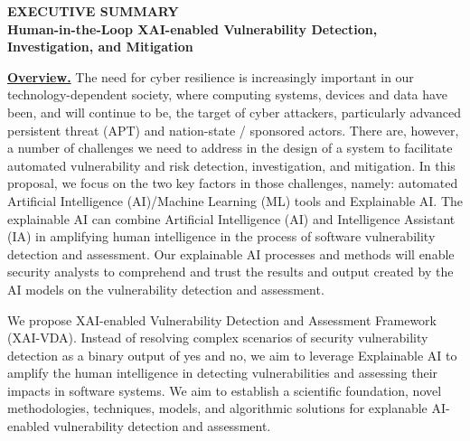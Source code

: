 \documentclass[11pt]{article}
\begin{document}

\begin{center}
  {\bf EXECUTIVE SUMMARY\\ Human-in-the-Loop XAI-enabled Vulnerability Detection, Investigation, and Mitigation}
\end{center}

\noindent \underline{\bf Overview.}  The need for cyber resilience is
increasingly important in our technology-dependent society, where
computing systems, devices and data have been, and will continue to
be, the target of cyber attackers, particularly advanced persistent
threat (APT) and nation-state / sponsored actors. There are, however,
a number of challenges we need to address in the design of a system to
facilitate automated vulnerability and risk detection, investigation,
and mitigation. In this proposal, we focus on the two key factors in
those challenges, namely: automated Artificial Intelligence
(AI)/Machine Learning (ML) tools and Explainable AI. The explainable AI
can combine Artificial Intelligence (AI) and Intelligence Assistant
(IA) in amplifying human intelligence in the process of software
vulnerability detection and assessment. Our explainable AI processes
and methods will enable security analysts to comprehend and trust the
results and output created by the AI models on the vulnerability
detection and assessment.


We propose XAI-enabled Vulnerability Detection and Assessment
Framework (XAI-VDA). Instead of resolving complex scenarios of
security vulnerability detection as a binary output of yes and no, we
aim to leverage Explainable AI to amplify the human intelligence in
detecting vulnerabilities and assessing their impacts in software
systems. We aim to establish a scientific foundation, novel
methodologies, techniques, models, and algorithmic solutions for
explanable AI-enabled vulnerability detection and assessment.

\end{document}

